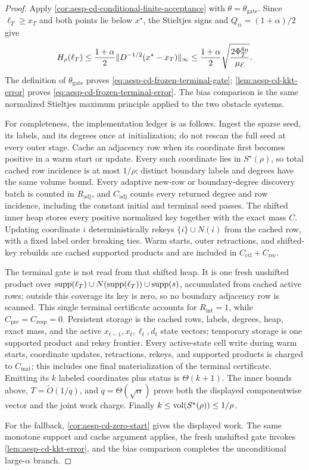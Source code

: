 \begin{proof}
Apply \cref{cor:aesp-cd-conditional-finite-acceptance} with
$\theta=\theta_{\mathrm{gate}}$.  Since
$\ell_T\geq x_T$ and both points lie below $x^\star$, the Stieltjes signs and
$Q_{ii}=(1+\alpha)/2$ give
\begin{equation*}
 H_\rho(\ell_T)
 \leq\frac{1+\alpha}{2}
       \lVert D^{-1/2}(x^\star-x_T)\rVert_\infty
 \leq\frac{1+\alpha}{2}
       \sqrt{\frac{2\Phi_T^{\mathrm{fin}}}{\mu_{\mathcal E}}}.
\end{equation*}
The definition of $\theta_{\mathrm{gate}}$ proves
\cref{eq:aesp-cd-frozen-terminal-gate};
\cref{lem:aesp-cd-kkt-error} proves
\cref{eq:aesp-cd-frozen-terminal-error}.  The bias comparison is the same
normalized Stieltjes maximum principle applied to the two obstacle systems.

For completeness, the implementation ledger is as follows.  Ingest the
sparse seed, its labels, and its degrees once at initialization; do not rescan
the full seed at every outer stage.  Cache an adjacency row when its
coordinate first becomes positive in a warm start or update.  Every such
coordinate lies in $S^\star(\rho)$, so total cached row incidence is at most
$1/\rho$; distinct boundary labels and degrees have the same volume bound.
Every adaptive new-row or boundary-degree discovery batch is counted in
$R_{\mathrm{adj}}$, and $C_{\mathrm{adj}}$ counts every returned degree and
row incidence, including the constant initial and terminal seed passes.
The shifted inner heap stores every positive normalized key together with the
exact mass $C$.  Updating coordinate $i$ deterministically rekeys
$\{i\}\cup N(i)$ from the cached row, with a fixed label order breaking ties.
Warm starts, outer retractions, and shifted-key rebuilds are cached supported
products and are included in $C_{\mathrm{ctl}}+C_{\mathrm{rec}}$.

The terminal gate is not read from that shifted heap.  It is one fresh
unshifted product over
$\operatorname{supp}(\ell_T)\cup N(\operatorname{supp}(\ell_T))\cup\operatorname{supp}(s)$, accumulated from cached
active rows; outside this coverage its key is zero, so no boundary adjacency
row is scanned.  This single terminal certificate accounts for
$R_{\mathrm{int}}=1$, while $C_{\mathrm{pre}}=C_{\mathrm{resp}}=0$.
Persistent storage is the cached rows, labels, degrees, heap, exact mass,
and the active $x_{t-1},x_t,\ell_t,d_t$ state vectors; temporary storage is
one supported product and rekey frontier.  Every active-state cell write
during warm starts, coordinate updates, retractions, rekeys, and supported
products is charged to $C_{\mathrm{mat}}$; this includes one final
materialization of the terminal certificate.  Emitting its $k$ labeled
coordinates plus status is $\Theta(k+1)$.  The inner bounds above,
$T=\widetilde O(1/q)$, and
$q=\Theta(\sqrt\alpha)$ prove both the displayed componentwise vector and the
joint work charge.  Finally
$k\leq\operatorname{vol}(S^\star(\rho))\leq1/\rho$.

For the fallback, \cref{cor:aesp-cd-zero-start} gives the displayed work.
The same monotone support and cache argument applies, the fresh unshifted
gate invokes \cref{lem:aesp-cd-kkt-error}, and the bias comparison completes
the unconditional large-$\alpha$ branch.
\end{proof}

